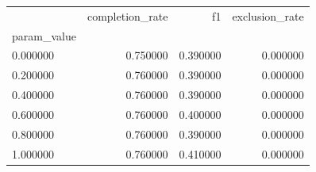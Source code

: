 \begin{tabular}{lrrr}
\toprule
 & completion_rate & f1 & exclusion_rate \\
param_value &  &  &  \\
\midrule
0.000000 & 0.750000 & 0.390000 & 0.000000 \\
0.200000 & 0.760000 & 0.390000 & 0.000000 \\
0.400000 & 0.760000 & 0.390000 & 0.000000 \\
0.600000 & 0.760000 & 0.400000 & 0.000000 \\
0.800000 & 0.760000 & 0.390000 & 0.000000 \\
1.000000 & 0.760000 & 0.410000 & 0.000000 \\
\bottomrule
\end{tabular}
